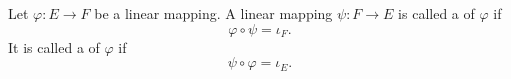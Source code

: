 Let $\varphi: E \to F$ be a linear mapping. A linear mapping $\psi: F \to E$ is called a  of $\varphi$ if
$$
\varphi \circ \psi = \iota_F.
$$
It is called a  of $\varphi$ if
$$
\psi \circ \varphi = \iota_E.
$$
